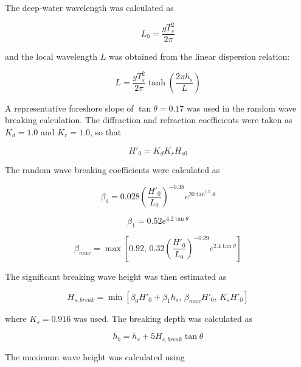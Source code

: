 \documentclass[a4paper, 11pt]{article}
\begin{document}
The deep-water wavelength was calculated as

\begin{equation}
    L_0=\frac{gT_s^2}{2\pi}
\end{equation}

and the local wavelength \(L\) was obtained from the linear dispersion relation:

\begin{equation}
    L=\frac{gT_s^2}{2\pi}\tanh\left(\frac{2\pi h_s}{L}\right)
\end{equation}

A representative foreshore slope of \(\tan\theta=0.17\) was used in the random wave breaking calculation. The diffraction and refraction coefficients were taken as \(K_d=1.0\) and \(K_r=1.0\), so that

\begin{equation}
    H'_0=K_dK_rH_{s0}
\end{equation}

The random wave breaking coefficients were calculated as

\begin{equation}
    \beta_0
    =
    0.028
    \left(\frac{H'_0}{L_0}\right)^{-0.38}
    e^{20\tan^{1.5}\theta}
\end{equation}

\begin{equation}
    \beta_1
    =
    0.52e^{4.2\tan\theta}
\end{equation}

\begin{equation}
    \beta_{max}
    =
    \max\left[
    0.92,\,
    0.32
    \left(\frac{H'_0}{L_0}\right)^{-0.29}
    e^{2.4\tan\theta}
    \right]
\end{equation}

The significant breaking wave height was then estimated as

\begin{equation}
    H_{s,break}
    =
    \min\left[
    \beta_0H'_0+\beta_1h_s,\,
    \beta_{max}H'_0,\,
    K_sH'_0
    \right]
\end{equation}

where \(K_s=0.916\) was used. The breaking depth was calculated as

\begin{equation}
    h_b=h_s+5H_{s,break}\tan\theta
\end{equation}

The maximum wave height was calculated using
\end{document}

